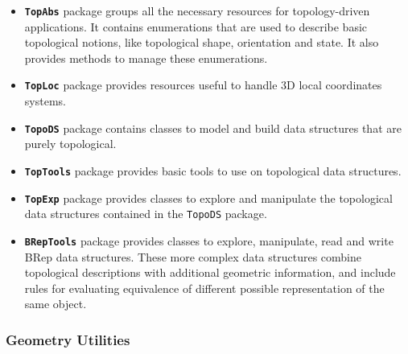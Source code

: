 \begin{itemize}
\renewcommand\labelitemi{\tiny$\blacksquare$}
\item \textbf{\lstinline[language=Java]!TopAbs!} package groups all the necessary resources for topology-driven applications. It contains enumerations that are used to describe basic topological notions, like topological shape, orientation and state. It also provides methods to manage these enumerations.
\item \textbf{\lstinline[language=Java]!TopLoc!} package provides resources useful to handle 3D local coordinates systems.
\item \textbf{\lstinline[language=Java]!TopoDS!} package contains classes to model and build data structures that are purely topological.
\item \textbf{\lstinline[language=Java]!TopTools!} package provides basic tools to use on topological data structures.
\item \textbf{\lstinline[language=Java]!TopExp!} package provides classes to explore and manipulate the topological data structures contained in the \lstinline[language=Java]!TopoDS! package.
\item \textbf{\lstinline[language=Java]!BRepTools!} package provides classes to explore, manipulate, read and write \gls{BRep} data structures. These more complex data structures combine topological descriptions with additional geometric information, and include rules for evaluating equivalence of different possible representation of the same object.
\end{itemize}
%

\subsubsection{Geometry Utilities}

